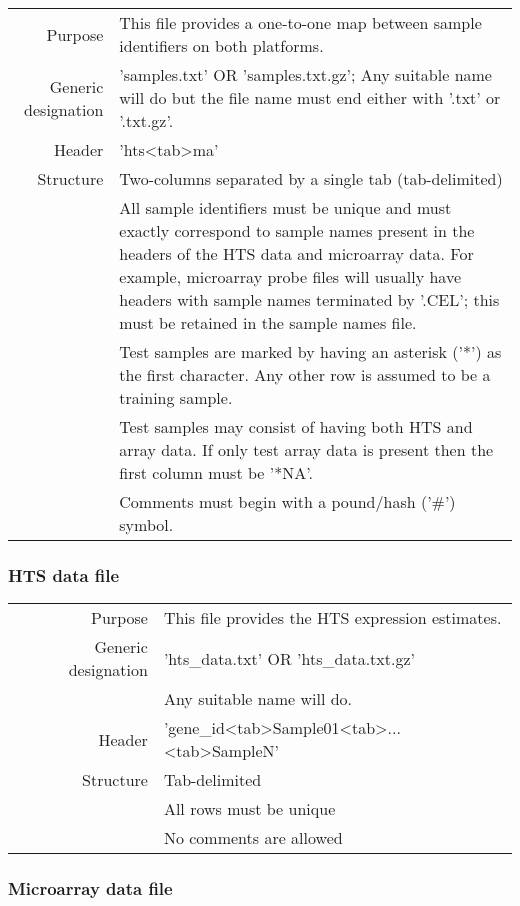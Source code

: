 \documentclass[a4paper,12pt]{article}
\begin{document}
\begin{tabular}{rp{12cm}}
Purpose & This file provides a one-to-one map between sample identifiers on both platforms. \\
Generic designation & 'samples.txt' OR 'samples.txt.gz'; Any suitable name will do but the file name must end either with '.txt' or '.txt.gz'. \\
Header & 'hts\textless tab\textgreater ma' \\
Structure & Two-columns separated by a single tab (tab-delimited) \\
  & All sample identifiers must be unique and must exactly correspond to sample names present in the headers of the HTS data and microarray data. For example, microarray probe files will usually have headers with sample names terminated by '.CEL'; this must be retained in the sample names file. \\
  & Test samples are marked by having an asterisk ('*') as the first character. Any other row is assumed to be a training sample. \\
  & Test samples may consist of having both HTS and array data. If only test array data is present then the first column must be '*NA'. \\
  & Comments must begin with a pound/hash ('\#') symbol. \\
\end{tabular}

\subsubsection{HTS data file}

\begin{tabular}{rp{12cm}}
Purpose & This file provides the HTS expression estimates.\\
Generic designation & 'hts\_data.txt' OR 'hts\_data.txt.gz' \\
  & Any suitable name will do. \\
Header & 'gene\_id\textless tab\textgreater Sample01\textless tab\textgreater...\textless tab\textgreater SampleN' \\
Structure & Tab-delimited \\
  & All rows must be unique \\
  & No comments are allowed \\
\end{tabular}

\subsubsection{Microarray data file}
\end{document}
